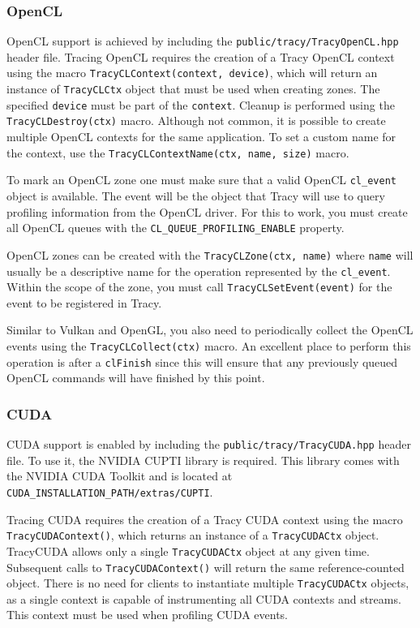 \documentclass[hidelinks,titlepage,a4paper,twoside]{article}
\begin{document}
\subsubsection{OpenCL}

OpenCL support is achieved by including the \texttt{public/tracy/TracyOpenCL.hpp} header file. Tracing OpenCL requires the creation of a Tracy OpenCL context using the macro \texttt{TracyCLContext(context, device)}, which will return an instance of \texttt{TracyCLCtx} object that must be used when creating zones. The specified \texttt{device} must be part of the \texttt{context}. Cleanup is performed using the \texttt{TracyCLDestroy(ctx)} macro. Although not common, it is possible to create multiple OpenCL contexts for the same application. To set a custom name for the context, use the \texttt{TracyCLContextName(ctx, name, size)} macro.

To mark an OpenCL zone one must make sure that a valid OpenCL \texttt{cl\_event} object is available. The event will be the object that Tracy will use to query profiling information from the OpenCL driver. For this to work, you must create all OpenCL queues with the \texttt{CL\_QUEUE\_PROFILING\_ENABLE} property.

OpenCL zones can be created with the \texttt{TracyCLZone(ctx, name)} where \texttt{name} will usually be a descriptive name for the operation represented by the \texttt{cl\_event}. Within the scope of the zone, you must call \texttt{TracyCLSetEvent(event)} for the event to be registered in Tracy.

Similar to Vulkan and OpenGL, you also need to periodically collect the OpenCL events using the \texttt{TracyCLCollect(ctx)} macro. An excellent place to perform this operation is after a \texttt{clFinish} since this will ensure that any previously queued OpenCL commands will have finished by this point.

\subsubsection{CUDA}

CUDA support is enabled by including the \texttt{public/tracy/TracyCUDA.hpp} header file. To use it, the NVIDIA CUPTI library is required. This library comes with the NVIDIA CUDA Toolkit and is located at \texttt{CUDA\_INSTALLATION\_PATH/extras/CUPTI}.

Tracing CUDA requires the creation of a Tracy CUDA context using the macro \texttt{TracyCUDAContext()}, which returns an instance of a \texttt{TracyCUDACtx} object. TracyCUDA allows only a single \texttt{TracyCUDACtx} object at any given time. Subsequent calls to \texttt{TracyCUDAContext()} will return the same reference-counted object. There is no need for clients to instantiate multiple \texttt{TracyCUDACtx} objects, as a single context is capable of instrumenting all CUDA contexts and streams. This context must be used when profiling CUDA events.
\end{document}
